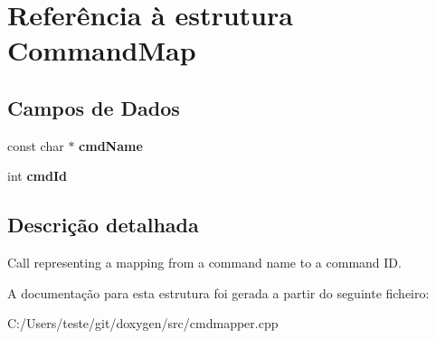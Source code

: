 \hypertarget{struct_command_map}{\section{Referência à estrutura Command\-Map}
\label{struct_command_map}
}
\subsection*{Campos de Dados}
\begin{DoxyCompactItemize}
\item 
\hypertarget{struct_command_map_acde4baff7055b0b5325e59b8f8001601}{const char $\ast$ {\bfseries cmd\-Name}}\label{struct_command_map_acde4baff7055b0b5325e59b8f8001601}

\item 
\hypertarget{struct_command_map_a1f37c5e3144a14c7848b49600cdf44db}{int {\bfseries cmd\-Id}}\label{struct_command_map_a1f37c5e3144a14c7848b49600cdf44db}

\end{DoxyCompactItemize}


\subsection{Descrição detalhada}
Call representing a mapping from a command name to a command I\-D. 

A documentação para esta estrutura foi gerada a partir do seguinte ficheiro\-:\begin{DoxyCompactItemize}
\item 
C\-:/\-Users/teste/git/doxygen/src/cmdmapper.\-cpp\end{DoxyCompactItemize}
